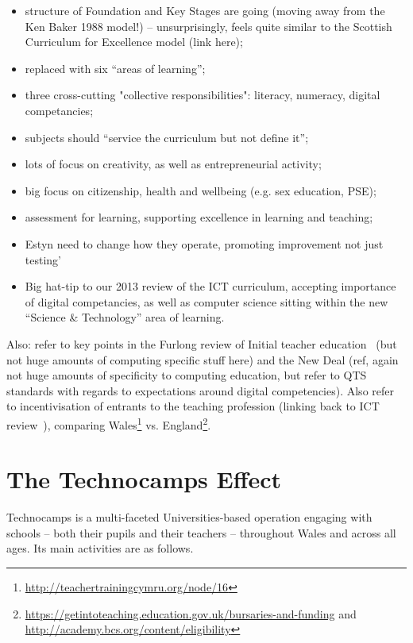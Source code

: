 \documentclass{sig-alternate}
\begin{document}
\begin{itemize}
\item structure of Foundation and Key Stages are going (moving away
  from the Ken Baker 1988 model!) -- unsurprisingly, feels quite
  similar to the Scottish Curriculum for Excellence model (link here);
\item replaced with six ``areas of learning'';
\item three cross-cutting "collective responsibilities": literacy, numeracy, digital competancies;
\item subjects should ``service the curriculum but not define it'';
\item lots of focus on creativity, as well as entrepreneurial activity;
\item big focus on citizenship, health and wellbeing (e.g. sex education, PSE);
\item assessment for learning, supporting excellence in learning and teaching;
\item Estyn need to change how they operate, promoting improvement not just testing'
\item Big hat-tip to our 2013 review of the ICT curriculum, accepting
  importance of digital competancies, as well as computer science
  sitting within the new ``Science \& Technology'' area of learning.
\end{itemize}

Also: refer to key points in the Furlong review of Initial teacher
education~\cite{Furlong:2015} (but not huge amounts of computing
specific stuff here) and the New Deal (ref, again not huge amounts of
specificity to computing education, but refer to QTS standards with
regards to expectations around digital competencies). Also refer to
incentivisation of entrants to the teaching profession (linking back
to ICT review~\cite{welshictreview:2013}), comparing
Wales\footnote{\url{http://teachertrainingcymru.org/node/16}}
vs. England\footnote{\url{https://getintoteaching.education.gov.uk/bursaries-and-funding}
and \url{http://academy.bcs.org/content/eligibility}}.


\section{The Technocamps Effect}

Technocamps is a multi-faceted Universities-based
operation engaging with schools -- both their pupils and their teachers --
throughout Wales and across all ages. Its main activities are as follows.
\end{document}
